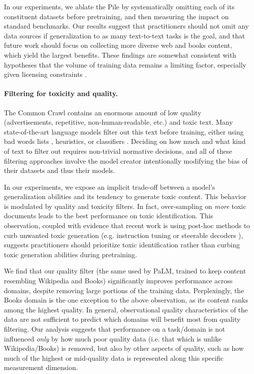 \documentclass{article}
\begin{document}
In our experiments, we ablate the Pile by systematically omitting each of its constituent datasets before pretraining, and then measuring the impact on standard benchmarks.
Our results suggest that practitioners should not omit any data sources if generalization to as many text-to-text tasks is the goal, and that future work should focus on collecting more diverse web and books content, which yield the largest benefits.
These findings are somewhat consistent with hypotheses that the volume of training data remains a limiting factor, especially given licensing constraints \citep{chinchilla2022implications}.

\vspace{-3mm}
\paragraph{Filtering for toxicity and quality.}
The Common Crawl contains an enormous amount of low quality (advertisements, repetitive, non-human-readable, etc.) and toxic text.
Many state-of-the-art language models filter out this text before training, either using bad words lists \citep{raffel2020exploring}, heuristics, or classifiers \citep{du_glam_2021,brown2020language,chowdhery2022palm}.
Deciding on how much and what kind of text to filter out requires non-trivial normative decisions, and all of these filtering approaches involve the model creator intentionally modifying the bias of their datasets and thus their models.

In our experiments, we expose an implicit trade-off between a model's generalization abilities and its tendency to generate toxic content.
This behavior is modulated by quality and toxicity filters.
In fact, over-sampling on \emph{more} toxic documents leads to the best performance on toxic identification.
This observation, coupled with evidence that recent work is using post-hoc methods to curb unwanted toxic generation (e.g. instruction tuning \citep{chung2022scaling} or steerable decoders \citep{dathathriplug, welbl2021challenges}), suggests practitioners should prioritize toxic identification rather than curbing toxic generation abilities during pretraining.

We find that our quality filter (the same used by PaLM, trained to keep content resembling Wikipedia and Books) significantly improves performance across domains, despite removing large portions of the training data.
Perplexingly, the Books domain is the one exception to the above observation, as its content ranks among the highest quality.
In general, observational quality characteristics of the data are not sufficient to predict which domains will benefit most from quality filtering.
Our analysis suggests that performance on a task/domain is not influenced \emph{only} by how much poor quality data (i.e. that which is unlike Wikipedia/Books) is removed, but also by other aspects of quality, such as how much of the highest or mid-quality data is represented along this specific measurement dimension.
\end{document}
